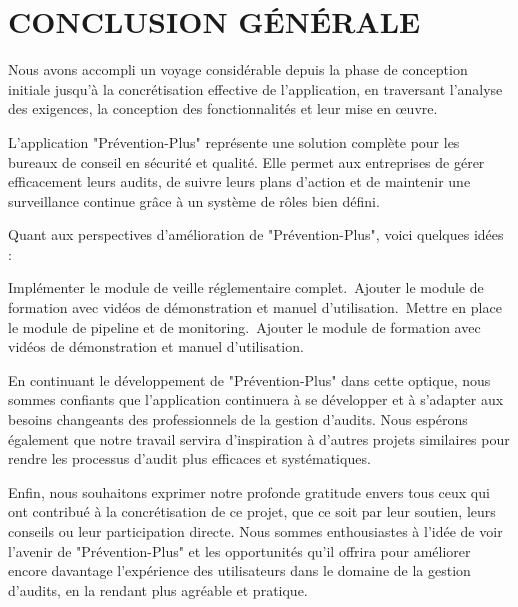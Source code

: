 \chapter*{CONCLUSION GÉNÉRALE}
\adjustmtc
\thispagestyle{MyStyle}

\noindent Nous avons accompli un voyage considérable depuis la phase de conception initiale jusqu'à la concrétisation effective de l'application, en traversant l'analyse des exigences, la conception des fonctionnalités et leur mise en œuvre.\par

L'application "Prévention-Plus" représente une solution complète pour les bureaux de conseil en sécurité et qualité. Elle permet aux entreprises de gérer efficacement leurs audits, de suivre leurs plans d'action et de maintenir une surveillance continue grâce à un système de rôles bien défini.\par

Quant aux perspectives d'amélioration de "Prévention-Plus", voici quelques idées :\

Implémenter le module de veille réglementaire complet.\
Ajouter le module de formation avec vidéos de démonstration et manuel d'utilisation.\
Mettre en place le module de pipeline et de monitoring.\
Ajouter le module de formation avec vidéos de démonstration et manuel d'utilisation.\par
En continuant le développement de "Prévention-Plus" dans cette optique, nous sommes confiants que l'application continuera à se développer et à s'adapter aux besoins changeants des professionnels de la gestion d'audits. Nous espérons également que notre travail servira d'inspiration à d'autres projets similaires pour rendre les processus d'audit plus efficaces et systématiques.\par

Enfin, nous souhaitons exprimer notre profonde gratitude envers tous ceux qui ont contribué à la concrétisation de ce projet, que ce soit par leur soutien, leurs conseils ou leur participation directe. Nous sommes enthousiastes à l'idée de voir l'avenir de "Prévention-Plus" et les opportunités qu'il offrira pour améliorer encore davantage l'expérience des utilisateurs dans le domaine de la gestion d'audits, en la rendant plus agréable et pratique.\par

